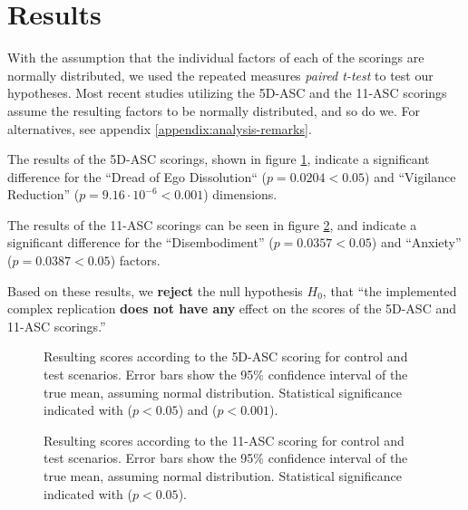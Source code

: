 \section{Results}

With the assumption that the individual factors of each of the scorings are normally distributed, we used the repeated measures \textit{paired t-test} to test our hypotheses. Most recent studies utilizing the \ac{5D-ASC} and the \ac{11-ASC} scorings assume the resulting factors to be normally distributed, and so do we. For alternatives, see appendix \ref{appendix:analysis-remarks}.

The results of the \ac{5D-ASC} scorings, shown in figure \ref{fig:results-5d-asc}, indicate a significant difference for the ``Dread of Ego Dissolution`` ($p = 0.0204 < 0.05$) and ``Vigilance Reduction'' ($p = 9.16 \cdot 10^{-6} < 0.001$) dimensions.

The results of the \ac{11-ASC} scorings can be seen in figure \ref{fig:results-11-asc}, and indicate a significant difference for the ``Disembodiment'' ($p = 0.0357 < 0.05$) and ``Anxiety'' ($p = 0.0387 < 0.05$) factors.

Based on these results, we \textbf{reject} the null hypothesis $H_0$, that ``the implemented complex replication \textbf{does not have any} effect on the scores of the \ac{5D-ASC} and \ac{11-ASC} scorings.''

\begin{figure}[H]
    \centering
    \caption{
        Resulting scores according to the \ac{5D-ASC} scoring for control and test scenarios.
        Error bars show the 95\% confidence interval of the true mean, assuming normal distribution.
        Statistical significance indicated with \raisebox{-0.7ex}{*} ($p < 0.05$) and \raisebox{-0.7ex}{***} ($p < 0.001$).
    }
    \label{fig:results-5d-asc}
\end{figure}

\begin{figure}[H]
    \centering
    \caption{
        Resulting scores according to the \ac{11-ASC} scoring for control and test scenarios.
        Error bars show the 95\% confidence interval of the true mean, assuming normal distribution.
        Statistical significance indicated with \raisebox{-0.7ex}{*} ($p < 0.05$).
    }
    \label{fig:results-11-asc}
\end{figure}
